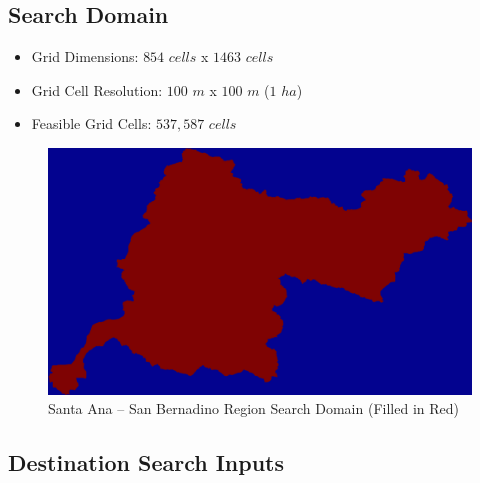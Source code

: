     \subsection{Search Domain}
    
    \begin{itemize}
      \setlength{\itemsep}{0cm}
      \setlength{\parskip}{0cm}
        \item Grid Dimensions: $854$ $cells$ x $1463$ $cells$
        \item Grid Cell Resolution: $100$ $m$ x $100$ $m$ ($1$ $ha$)
        \item Feasible Grid Cells: $537,587$ $cells$
    \end{itemize}
    
        \begin{figure}[!h]
            \begin{center}
            \includegraphics[width=5.5in]{figures/SanBernadino_SearchDomain.png}   
            \caption{Santa Ana -- San Bernadino Region Search Domain (Filled in Red)}
            \label{fig:SASBdomain}
            \end{center}
        \end{figure}
        
\subsection{Destination Search Inputs}
    
